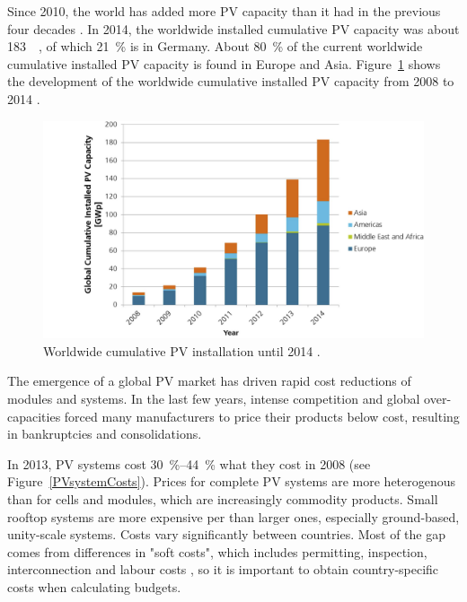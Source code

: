 Since 2010, the world has added more \ac{PV} capacity than it had in the previous four decades \cite{IEA2014c}. In 2014, the worldwide installed cumulative \ac{PV} capacity was about \SI{183}{\giga\wattp}, of which \SI{21}{\percent} is in Germany. About \SI{80}{\percent} of the current worldwide cumulative installed \ac{PV} capacity is found in Europe and Asia. Figure~\ref{PV_Install_global} shows the development of the worldwide cumulative installed \ac{PV} capacity from 2008 to 2014 \cite{FraunhoferISE2015}.


\begin{figure}[htbp]  
\centering
\includegraphics[width=0.7\linewidth]{FIG/PV_Install_global}
\caption[Worldwide cumulative PV installation until 2014.]{Worldwide cumulative PV installation until 2014 \cite{FraunhoferISE2015}.}\label{PV_Install_global}
\end{figure}
The emergence of a global \ac{PV} market has driven rapid cost reductions of modules and systems. In the last few years, intense competition and global over-capacities forced many manufacturers to price their products below cost, resulting in bankruptcies and consolidations. 

In 2013, \ac{PV} systems cost \SIrange{30}{44}{\percent} what they cost in 2008 (see Figure~\ref{PVsystemCosts}). Prices for complete \ac{PV} systems are more heterogenous than for cells and modules, which are increasingly commodity products. Small rooftop systems are more expensive per \si{\wattp} than larger ones, especially ground-based, unity-scale systems. Costs vary significantly between countries. Most of the gap comes from differences in "soft costs", which includes permitting, inspection, interconnection and labour costs \cite{IEA2014c}, so it is important to obtain country-specific costs when calculating budgets.

